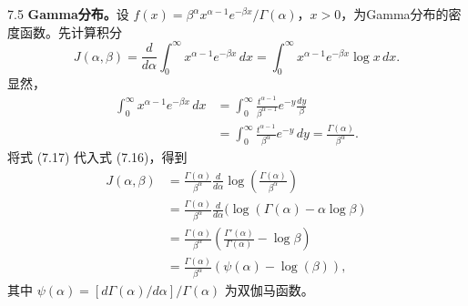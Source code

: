 \begin{bookexample}{7.5}
\textbf{Gamma分布。}设 $f(x)=\beta^\alpha x^{\alpha-1}e^{-\beta x}/\Gamma(\alpha)$，$x>0$，为Gamma分布的密度函数。先计算积分
\begin{equation}
J(\alpha,\beta)=\frac d{d\alpha}\int_0^\infty x^{\alpha-1}e^{-\beta x}\,dx
=\int_0^\infty x^{\alpha-1}e^{-\beta x}\log x\,dx.
\tag{7.16}
\end{equation}
显然，
\begin{equation}
\begin{aligned}
\int_0^\infty x^{\alpha-1}e^{-\beta x}\,dx
&=\int_0^\infty\frac{t^{\alpha-1}}{\beta^{\alpha-1}}e^{-y}\frac{dy}\beta\\
&=\int_0^\infty\frac{t^{\alpha-1}}{\beta^\alpha}e^{-y}\,dy
=\frac{\Gamma(\alpha)}{\beta^\alpha}.
\end{aligned}
\tag{7.17}
\end{equation}
将式 (7.17) 代入式 (7.16)，得到
\begin{equation}
\begin{aligned}
J(\alpha,\beta)&=\frac{\Gamma(\alpha)}{\beta^\alpha}\frac d{d\alpha}
\log\left(\frac{\Gamma(\alpha)}{\beta^\alpha}\right)\\
&=\frac{\Gamma(\alpha)}{\beta^\alpha}\frac d{d\alpha}
(\log(\Gamma(\alpha)-\alpha\log\beta)\\
&=\frac{\Gamma(\alpha)}{\beta^\alpha}\left(\frac{\Gamma'(\alpha)}{\Gamma(\alpha)}-\log\beta\right)\\
&=\frac{\Gamma(\alpha)}{\beta^\alpha}(\psi(\alpha)-\log(\beta)),
\end{aligned}
\tag{7.18}
\end{equation}
其中 $\psi(\alpha)=[d\Gamma(\alpha)/d\alpha]/\Gamma(\alpha)$ 为双伽马函数。


\end{bookexample}
